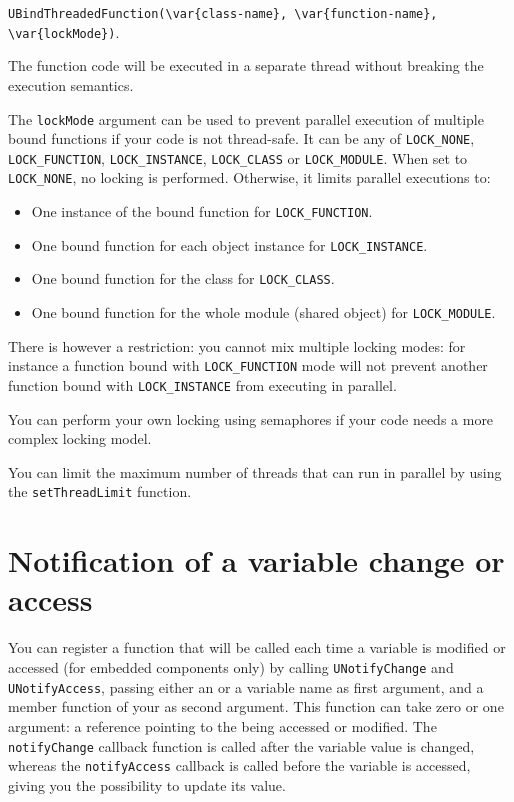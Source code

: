 \lstinline|UBindThreadedFunction(\var{class-name}, \var{function-name}, \var{lockMode})|.

The function code will be executed in a separate thread without breaking the
\us execution semantics.

The \lstinline{lockMode} argument can be used to prevent parallel execution
of multiple bound functions if your code is not thread-safe. It can be any of
\lstinline{LOCK_NONE}, \lstinline{LOCK_FUNCTION}, \lstinline{LOCK_INSTANCE},
\lstinline{LOCK_CLASS} or \lstinline{LOCK_MODULE}.
When set to \lstinline{LOCK_NONE}, no locking is performed. Otherwise, it
limits parallel executions to:

\begin{itemize}
\item One instance of the bound function for \lstinline{LOCK_FUNCTION}.
\item One bound function for each object instance for
\lstinline{LOCK_INSTANCE}.
\item One bound function for the class for \lstinline{LOCK_CLASS}.
\item One bound function for the whole module (shared object) for
\lstinline{LOCK_MODULE}.
\end{itemize}

There is however a restriction: you cannot mix multiple locking modes: for
instance a function bound with \lstinline{LOCK_FUNCTION} mode will not prevent
another function bound with \lstinline{LOCK_INSTANCE} from executing in
parallel.

You can perform your own locking using semaphores if your code needs a more
complex locking model.

You can limit the maximum number of threads that can run in parallel by using
the \lstinline{setThreadLimit} function.

\section{Notification of a variable change or access}
\label{sec:uobject:uvar-notify}
You can register a function that will be called each time a variable
is modified or accessed (for embedded components only) by calling
\lstinline{UNotifyChange} and \lstinline{UNotifyAccess}, passing
either an \UVar or a variable name as first argument, and a member
function of your \UObject as second argument. This function can take
zero or one argument: a \UVar reference pointing to the \UVar being
accessed or modified. The \lstinline{notifyChange} callback function
is called after the variable value is changed, whereas the
\lstinline{notifyAccess} callback is called before the variable is
accessed, giving you the possibility to update its value.

